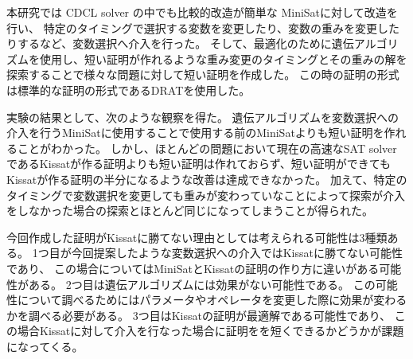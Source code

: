 本研究では CDCL solver の中でも比較的改造が簡単な MiniSatに対して改造を行い、
特定のタイミングで選択する変数を変更したり、変数の重みを変更したりするなど、変数選択へ介入を行った。
そして、最適化のために遺伝アルゴリズムを使用し、短い証明が作れるような重み変更のタイミングとその重みの解を探索することで様々な問題に対して短い証明を作成した。
この時の証明の形式は標準的な証明の形式であるDRATを使用した。

実験の結果として、次のような観察を得た。
遺伝アルゴリズムを変数選択への介入を行うMiniSatに使用することで使用する前のMiniSatよりも短い証明を作れることがわかった。
しかし、ほとんどの問題において現在の高速なSAT solverであるKissatが作る証明よりも短い証明は作れておらず、短い証明ができてもKissatが作る証明の半分になるような改善は達成できなかった。
加えて、特定のタイミングで変数選択を変更しても重みが変わっていなことによって探索が介入をしなかった場合の探索とほとんど同じになってしまうことが得られた。

今回作成した証明がKissatに勝てない理由としては考えられる可能性は3種類ある。
1つ目が今回提案したような変数選択への介入ではKissatに勝てない可能性であり、
この場合についてはMiniSatとKissatの証明の作り方に違いがある可能性がある。
2つ目は遺伝アルゴリズムには効果がない可能性である。
この可能性について調べるためにはパラメータやオペレータを変更した際に効果が変わるかを調べる必要がある。
3つ目はKissatの証明が最適解である可能性であり、
この場合Kissatに対して介入を行なった場合に証明をを短くできるかどうかが課題になってくる。